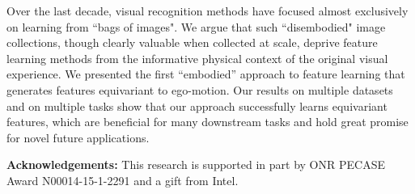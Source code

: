 \documentclass[10pt,twocolumn,letterpaper]{article}
\newcommand{\newchanges}{}
\newcommand{\changes}{}
\begin{document}
Over the last decade, visual recognition methods have focused almost exclusively on learning from \newchanges{``bags of images".  We argue that} such ``disembodied" image collections, though clearly valuable when collected at scale, deprive feature learning methods from the informative physical context of the original visual experience.  We presented the first ``embodied'' approach to feature learning that generates features equivariant to ego-motion. Our results on multiple datasets and on multiple tasks show that our approach successfully learns equivariant features, which are beneficial for many downstream tasks and hold great promise for novel future applications.

\vspace{0.05in}\noindent\small{\textbf{Acknowledgements:} This research is supported in part by ONR PECASE Award N00014-15-1-2291 and a gift from Intel.}
\newpage
\small{


}
\newpage
\end{document}
